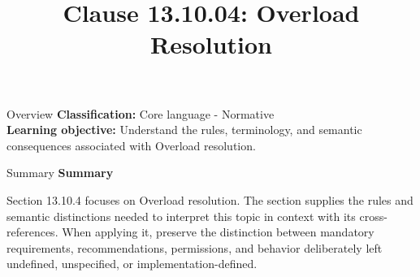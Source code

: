 \documentclass[10pt,letterpaper]{article}
\title{Clause 13.10.04: Overload Resolution}
\author{}
\date{}
\begin{document}
\maketitle
\begin{CornellOverviewBox}{Overview}
\textbf{Classification:} Core language - Normative\\[2pt]
\textbf{Learning objective:} Understand the rules, terminology, and semantic consequences associated with Overload resolution.
\end{CornellOverviewBox}\begin{CornellSummaryBox}{Summary}
{\sffamily\bfseries\color{Accent} Summary}\par\vspace{3pt}Section 13.10.4 focuses on Overload resolution. The section supplies the rules and semantic distinctions needed to interpret this topic in context with its cross-references. When applying it, preserve the distinction between mandatory requirements, recommendations, permissions, and behavior deliberately left undefined, unspecified, or implementation-defined.
\end{CornellSummaryBox}
\end{document}
